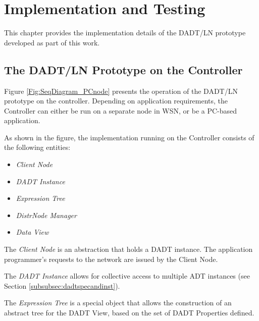 \chapter{Implementation and Testing}\label{chap:implementation}

This chapter provides the implementation details of the DADT/LN prototype
developed as part of this work.  




\section{The DADT/LN Prototype on the Controller}

Figure \ref{Fig:SeqDiagram_PCnode} presents the operation of the DADT/LN
prototype on the controller. 
Depending on application requirements, the Controller can either be run on a separate
node in WSN, or be a PC-based application.

As shown in the figure, the implementation running on the Controller consists of
the following entities:

\begin{itemize}
  \item \emph{Client Node}
  \item \emph{DADT Instance}
  \item \emph{Expression Tree} 
  \item \emph{DistrNode Manager} 
  \item \emph{Data View} 
\end{itemize}

The \emph{Client Node} is an abstraction that holds a DADT
instance. The application programmer's requests to the network are issued
by the Client Node.
  
The \emph{DADT Instance} allows for collective access to multiple ADT instances (see Section \ref{subsubsec:dadtspecandinst}).

The \emph{Expression Tree} is a special object that allows the construction of an abstract
tree for the DADT View, based on the set of DADT Properties defined.

